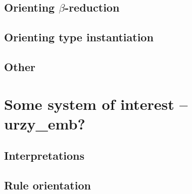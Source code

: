 \documentclass[runningheads,a4paper]{llncs}
\begin{document}
\subsection{Orienting $\beta$-reduction}

\subsection{Orienting type instantiation}

\subsection{Other}

\section{Some system of interest -- urzy\_emb?}

\subsection{Interpretations}

\subsection{Rule orientation}
\end{document}
